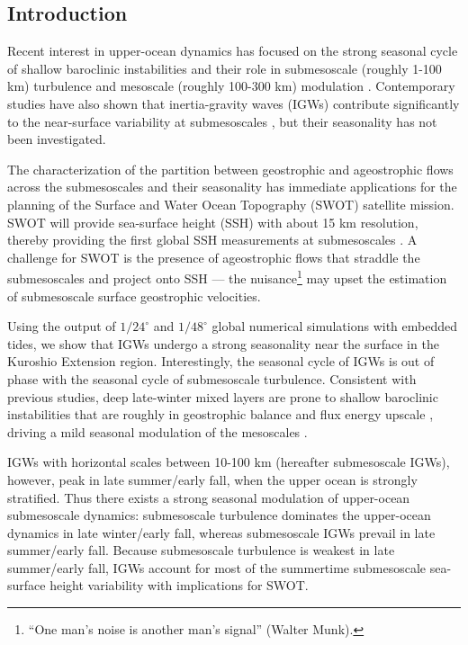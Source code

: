 \documentclass[grl]{agutex2015}
\begin{document}
\begin{article}

%
%

\section{Introduction}

Recent interest in upper-ocean dynamics has focused on the strong seasonal
cycle of shallow baroclinic instabilities and their role in submesoscale (roughly 1-100 km)
turbulence and mesoscale (roughly 100-300 km) modulation \citep{sasaki_etal2014,qiu_etal2014,
brannigan_etal2015,callies_etal2015, thompson_etal2016,buckingham_etal2016}. Contemporary studies
have also shown that inertia-gravity waves (IGWs) contribute significantly
to the near-surface variability at submesoscales \citep{richman_etal2012,
buhler_etal2014,rocha_etal2016}, but their seasonality has not been investigated.

The characterization of the partition between geostrophic and ageostrophic flows across
the submesoscales and their seasonality has immediate applications for the planning
of the Surface and Water Ocean Topography (SWOT) satellite mission.
SWOT will provide
sea-surface height (SSH) with about 15 km resolution, thereby providing the
first global SSH measurements at submesoscales \citep{fu_ubelmann2014}. A
challenge for SWOT is the presence of ageostrophic flows that straddle the submesoscales and project
onto SSH \citep[e.g., ][]{richman_etal2012} --- the
nuisance\footnote{``One man's noise is
another man's signal'' (Walter Munk).} may upset the estimation
of submesoscale surface geostrophic velocities.

Using the output of $1/24^\circ$ and $1/48^\circ$ global
numerical simulations with embedded tides, we show that IGWs undergo
a strong seasonality near the surface in the Kuroshio Extension region.
Interestingly, the seasonal cycle of IGWs is out of phase
with the seasonal cycle of submesoscale turbulence. Consistent with previous studies,
deep late-winter mixed layers are prone to
shallow baroclinic instabilities that are roughly in geostrophic balance
and flux energy upscale \citep{sasaki_etal2014,callies_etal2016},
driving a mild seasonal modulation of the mesoscales \citep{sasaki_etal2014,qiu_etal2014}.

IGWs with horizontal scales between 10-100 km (hereafter submesoscale IGWs),
however, peak in late summer/early fall,
when the upper ocean is strongly stratified. Thus there exists a
strong seasonal modulation of upper-ocean submesoscale dynamics:
submesoscale turbulence dominates the upper-ocean dynamics in late winter/early fall,
whereas submesoscale IGWs prevail in late summer/early fall.
Because submesoscale turbulence is weakest in late summer/early fall,
IGWs account for most of the
summertime submesoscale sea-surface height variability with implications for SWOT.


\end{article}
\end{document}
